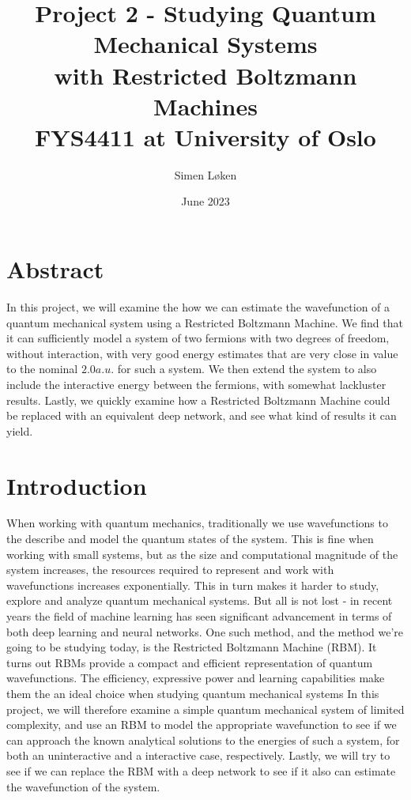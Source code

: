 \documentclass{article}
\title{%
Project 2 - Studying Quantum Mechanical Systems \\
with Restricted Boltzmann Machines \\
\large FYS4411 at University of Oslo}
\author{Simen Løken}
\date{June 2023}
\begin{document}
\nocite{*}
\maketitle
{
  \hypersetup{linkcolor=black}
  \tableofcontents
}
\section{Abstract}
In this project, we will examine the how we can estimate the wavefunction of a quantum mechanical system using a Restricted Boltzmann Machine. We find that it can sufficiently model a system of two fermions with two degrees of freedom, without interaction, with very good energy estimates that are very close in value to the nominal $2.0 a.u.$ for such a system. We then extend the system to also include the interactive energy between the fermions, with somewhat lackluster results. Lastly, we quickly examine how a Restricted Boltzmann Machine could be replaced with an equivalent deep network, and see what kind of results it can yield.
\section{Introduction}
When working with quantum mechanics, traditionally we use wavefunctions to the describe and model the quantum states of the system. This is fine when working with small systems, but as the size and computational magnitude of the system increases, the resources required to represent and work with wavefunctions increases exponentially. This in turn makes it harder to study, explore and analyze quantum mechanical systems.
\newline
But all is not lost - in recent years the field of machine learning has seen significant advancement in terms of both deep learning and neural networks. One such method, and the method we're going to be studying today, is the Restricted Boltzmann Machine (RBM). It turns out RBMs provide a compact and efficient representation of quantum wavefunctions. The efficiency, expressive power and learning capabilities make them the an ideal choice when studying quantum mechanical systems
\newline In this project, we will therefore examine a simple quantum mechanical system of limited complexity, and use an RBM to model the appropriate wavefunction to see if we can approach the known analytical solutions to the energies of such a system, for both an uninteractive and a interactive case, respectively. Lastly, we will try to see if we can replace the RBM with a deep network to see if it also can estimate the wavefunction of the system. \newpage
\end{document}
